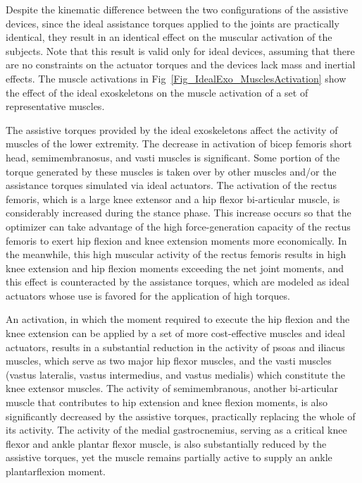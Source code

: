 \documentclass[10pt,letterpaper]{article}
\begin{document}
Despite the kinematic difference between the two configurations of the assistive devices, since the ideal assistance torques applied to the joints are practically identical, they result in an identical effect on the muscular activation of the subjects. Note that this result is valid only for ideal devices, assuming that there are no constraints on the actuator torques and the devices lack mass and inertial effects. The muscle activations in Fig~\ref{Fig_IdealExo_MusclesActivation} show the effect of the ideal exoskeletons on the muscle activation of a set of representative muscles.

The assistive torques provided by the ideal exoskeletons affect the activity of muscles of the lower extremity. The decrease in activation of bicep femoris short head, semimembranosus, and vasti muscles is significant. Some portion of the torque generated by these muscles is taken over by other muscles and/or the assistance torques simulated via ideal actuators. The activation of the rectus femoris, which is a large knee extensor and a hip flexor bi-articular muscle, is considerably increased during the stance phase. This increase occurs so that the optimizer can take advantage of the high force-generation capacity of the rectus femoris to exert hip flexion and knee extension moments more economically. In the meanwhile, this high muscular activity of the rectus femoris results in high knee extension and hip flexion moments exceeding the net joint moments, and this effect is counteracted by the assistance torques, which are modeled as
ideal actuators whose use is favored for the application of high torques.

An activation, in which the moment required to execute the hip flexion and the knee extension can be applied by a set of more cost-effective muscles and ideal actuators, results in a substantial reduction in the activity of psoas and iliacus muscles, which serve as two major hip flexor muscles, and the vasti muscles (vastus lateralis, vastus intermedius, and vastus medialis) which constitute the knee extensor muscles. The activity of semimembranous, another bi-articular muscle that contributes to hip extension and knee flexion moments, is also significantly decreased by the assistive torques, practically replacing the whole of its activity. The activity of the medial gastrocnemius, serving as a critical knee flexor and ankle plantar flexor muscle, is also substantially reduced by the assistive torques, yet the muscle remains partially active to supply an ankle plantarflexion moment.
\end{document}
